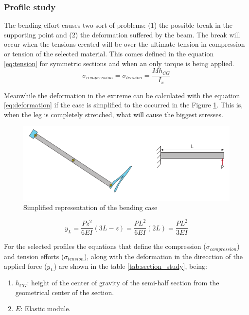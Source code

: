 \subsubsection{Profile study} %
\label{ssub:profile_study}
  The bending effort causes two sort of problems: (1) the possible break in the supporting point and (2) the deformation suffered by the beam.
  The break will occur when the tensions created will be over the ultimate tension in compression or tension of the selected material.
  This comes defined in the equation \ref{eq:tension} for symmetric sections and when an only torque is being applied.
  \begin{equation}
  \label{eq:tension}
    \sigma _{compression} = \sigma _{tension} = \frac{M h_{CG}}{I_x}
  \end{equation}

  Meanwhile the deformation in the extreme can be calculated with the equation \ref{eq:deformation} if the case is simplified to the occurred in the Figure \ref{fig:bending_case}.
  This is, when the leg is completely stretched, what will cause the biggest stresses.

  \begin{figure}[ht!]
    \centering
    \includegraphics[width=\textwidth]{figures/bending_case.pdf}
    \caption{Simplified representation of the bending case}
    \label{fig:bending_case}
  \end{figure}

  \begin{equation}
  \label{eq:deformation}
    y_L = \frac{P z^2}{6EI}(3L-z) = \frac{P L^2}{6EI}(2L) = \frac{P L^2}{3EI}
  \end{equation}


  For the selected profiles the equations that define the compression ($\sigma _{compression}$) and tension efforts ($\sigma _{tension}$), along with the deformation in the direcction of the applied force ($y_L$) are shown in the table \ref{tab:section_study}, being:

  \begin{enumerate}
    \item $h_{CG}$: height of the center of gravity of the semi-half section from the geometrical center of the section.

    \item $E$: Elastic module.
  \end{enumerate}


